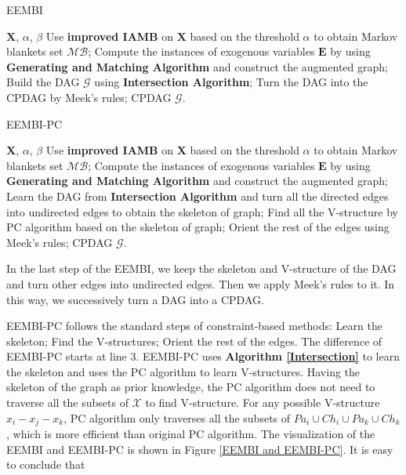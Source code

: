 \documentclass[twoside,11pt]{article}
\begin{document}
\begin{algorithm}
\renewcommand{\algorithmicrequire}{\textbf{Input:}}
\renewcommand{\algorithmicensure}{\textbf{Output:}}
\caption{EEMBI}
\label{EEMBI}
\begin{algorithmic}[1]
\REQUIRE $\mathbf X$, $\alpha$, $\beta$
\STATE Use \textbf{improved IAMB} on $\mathbf X$ based on the threshold $\alpha$ to obtain Markov blankets set $\mathcal{MB}$;
\STATE Compute the instances of exogenous variables $\mathbf E$ by using \textbf{Generating and Matching Algorithm} and construct the augmented graph;
\STATE Build the DAG $\mathcal G$ using \textbf{Intersection Algorithm};
\STATE Turn the DAG into the CPDAG by Meek's rules;
\ENSURE CPDAG $\mathcal G$.
\end{algorithmic}
\end{algorithm}


\begin{algorithm}
\renewcommand{\algorithmicrequire}{\textbf{Input:}}
\renewcommand{\algorithmicensure}{\textbf{Output:}}
\caption{EEMBI-PC}
\label{EEMBI-PC}
\begin{algorithmic}[1]
\REQUIRE $\mathbf X$, $\alpha$, $\beta$
\STATE Use \textbf{improved IAMB} on $\mathbf X$ based on the threshold $\alpha$ to obtain Markov blankets set $\mathcal{MB}$;
\STATE Compute the instances of exogenous variables $\mathbf E$ by using \textbf{Generating and Matching Algorithm} and construct the augmented graph;
\STATE Learn the DAG from \textbf{Intersection Algorithm} and turn all the directed edges into undirected edges to obtain the skeleton of graph;
\STATE Find all the V-structure by PC algorithm based on the skeleton of graph;
\STATE Orient the rest of the edges using Meek's rules;
\ENSURE CPDAG $\mathcal G$.
\end{algorithmic}
\end{algorithm}

In the last step of the EEMBI, we keep the skeleton and V-structure of the DAG and turn other edges into undirected edges. Then we apply Meek's rules to it. In this way, we successively turn a DAG into a CPDAG.

EEMBI-PC follows the standard steps of constraint-based methods: Learn the skeleton; Find the V-structures; Orient the rest of the edges. The difference of EEMBI-PC starts at line 3. EEMBI-PC uses \textbf{Algorithm \ref{Intersection}} to learn the skeleton and uses the PC algorithm to learn V-structures. Having the skeleton of the graph as prior knowledge, the PC algorithm does not need to traverse all the subsets of $\mathcal X$ to find V-structure. For any possible V-structure $x_i-x_j-x_k$, PC algorithm only traverses all the subsets of $Pa_i\cup Ch_i\cup Pa_k\cup Ch_k$, which is more efficient than original PC algorithm. The visualization of the EEMBI and EEMBI-PC is shown in Figure \ref{EEMBI and EEMBI-PC}. It is easy to conclude that 
\end{document}
